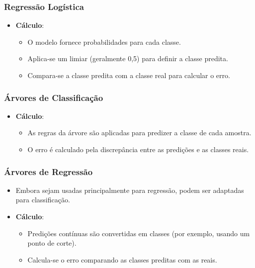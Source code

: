 \documentclass{sciposter}
\begin{document}
\begin{multicols}{3}
\subsubsection*{Regressão Logística}

\begin{itemize}
    \item \textbf{Cálculo}:
    \begin{itemize}
        \item O modelo fornece probabilidades para cada classe.
        \item Aplica-se um limiar (geralmente 0,5) para definir a classe predita.
        \item Compara-se a classe predita com a classe real para calcular o erro.
    \end{itemize}
\end{itemize}

\subsubsection*{Árvores de Classificação}

\begin{itemize}
    \item \textbf{Cálculo}:
    \begin{itemize}
        \item As regras da árvore são aplicadas para predizer a classe de cada amostra.
        \item O erro é calculado pela discrepância entre as predições e as classes reais.
    \end{itemize}
\end{itemize}

\subsubsection*{Árvores de Regressão}

\begin{itemize}
    \item Embora sejam usadas principalmente para regressão, podem ser adaptadas para classificação.
    \item \textbf{Cálculo}:
    \begin{itemize}
        \item Predições contínuas são convertidas em classes (por exemplo, usando um ponto de corte).
        \item Calcula-se o erro comparando as classes preditas com as reais.
    \end{itemize}
\end{itemize}


\end{multicols}
\end{document}
